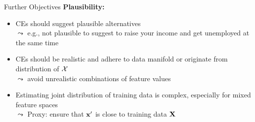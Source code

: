 \documentclass[11pt,compress,t,notes=noshow, aspectratio=169, xcolor=table, usenames,dvipsnames]{beamer}
\begin{document}
\begin{frame}{Further Objectives}
		\textbf{Plausibility:}
		\begin{itemize}
			\item<1-> CEs should suggest plausible alternatives\\
			$\leadsto$ e.g., not plausible to suggest to raise your income and get unemployed at the same time
			\item<2-> CEs should be realistic and adhere to data manifold or originate from distribution of $\mathcal{X}$\\
			$\leadsto$ avoid unrealistic combinations of feature values
			\item<3-> Estimating joint distribution of training data is complex, especially for mixed feature spaces\\
			$\leadsto$ Proxy: ensure that $\mathbf{x}'$ is close to training data $\mathbf{X}$
		\end{itemize}	

\end{frame}
\end{document}
